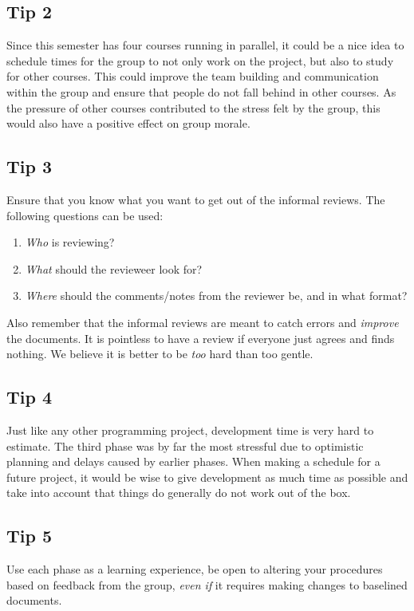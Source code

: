 \documentclass{article}
\begin{document}
    \subsection{Tip 2}
        Since this semester has four courses running in parallel, it could be a nice idea
        to schedule times for the group to not only work on the project, but also to study
        for other courses. This could improve the team building and communication within the
        group and ensure that people do not fall behind in other courses. As the pressure of other
        courses contributed to the stress felt by the group, this would also have a positive effect on group morale.
    
    \subsection{Tip 3}
        Ensure that you know what you want to get out of the informal reviews. The following
        questions can be used:
        \begin{enumerate}
            \item \emph{Who} is reviewing?
            \item \emph{What} should the revieweer look for?
            \item \emph{Where} should the comments/notes from the reviewer be, and in what format?
        \end{enumerate}
        Also remember that the informal reviews are meant to catch errors and \emph{improve}
        the documents. It is pointless to have a review if everyone just agrees and finds nothing. 
        We believe it is better to be \emph{too} hard than too gentle.
        
    \subsection{Tip 4}
        Just like any other programming project, development time is very hard to estimate. 
        The third phase was by far the most stressful due to optimistic planning and delays caused by earlier phases. 
        When making a schedule for a future project, it would be wise to give development as much time as possible and 
        take into account that things do generally do not work out of the box.
        
    \subsection{Tip 5}
        Use each phase as a learning experience, be open to altering your procedures based on feedback from the group, \emph{even if} it requires making changes to baselined documents.
        
\end{document}
